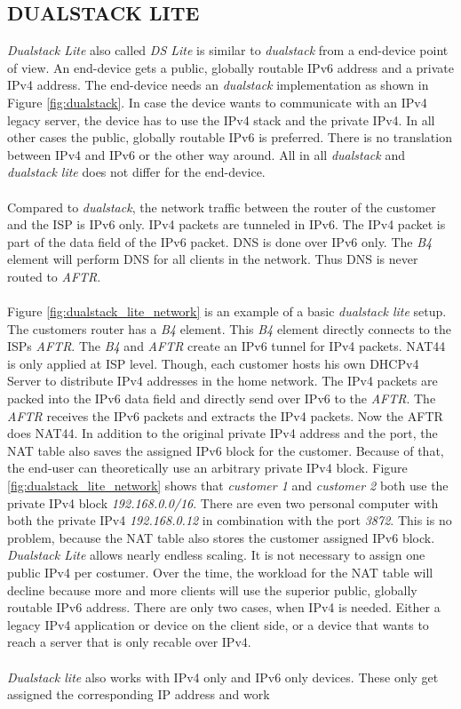 \documentclass[format=sigconf, natbib=true, nonacm=true]{acmart}
\begin{document}
    \subsection{DUALSTACK LITE}
    \textit{Dualstack Lite} also called \textit{DS Lite} is similar to \textit{dualstack} from a end-device point of view. An end-device gets a public, globally routable IPv6 address and a private IPv4 address. The end-device needs an \textit{dualstack} implementation as shown in Figure \ref{fig:dualstack}. In case the device wants to communicate with an IPv4 legacy server, the device has to use the IPv4 stack and the private IPv4. In all other cases the public, globally routable IPv6 is preferred. There is no translation between IPv4 and IPv6 or the other way around. All in all \textit{dualstack} and \textit{dualstack lite} does not differ for the end-device.\\\\Compared to \textit{dualstack}, the network traffic between the router of the customer and the ISP is IPv6 only. IPv4 packets are tunneled in IPv6. The IPv4 packet is part of the data field of the IPv6 packet. DNS is done over IPv6 only. The \textit{B4} element will perform DNS for all clients in the network. Thus DNS is never routed to \textit{AFTR}.\\\\Figure \ref{fig:dualstack_lite_network} is an example of a basic \textit{dualstack lite} setup. The customers router has a \textit{B4} element. This \textit{B4} element directly connects to the ISPs \textit{AFTR}. The \textit{B4} and \textit{AFTR} create an IPv6 tunnel for IPv4 packets. NAT44 is only applied at ISP level. Though, each customer hosts his own DHCPv4 Server to distribute IPv4 addresses in the home network. The IPv4 packets are packed into the IPv6 data field and directly send over IPv6 to the \textit{AFTR}. The \textit{AFTR} receives the IPv6 packets and extracts the IPv4 packets. Now the AFTR does NAT44. In addition to the original private IPv4 address and the port, the NAT table also saves the assigned IPv6 block for the customer. Because of that, the end-user can theoretically use an arbitrary private IPv4 block\cite{rfc6333}. Figure \ref{fig:dualstack_lite_network} shows that \textit{customer 1} and \textit{customer 2} both use the private IPv4 block \textit{192.168.0.0/16}. There are even two personal computer with both the private IPv4 \textit{192.168.0.12} in combination with the port \textit{3872}. This is no problem, because the NAT table also stores the customer assigned IPv6 block. \textit{Dualstack Lite} allows nearly endless scaling. It is not necessary to assign one public IPv4 per costumer. Over the time, the workload for the NAT table will decline because more and more clients will use the superior public, globally routable IPv6 address. There are only two cases, when IPv4 is needed. Either a legacy IPv4 application or device on the client side, or a device that wants to reach a server that is only recable over IPv4.\\\\\textit{Dualstack lite} also works with IPv4 only and IPv6 only devices. These only get assigned the corresponding IP address and work 
\end{document}
